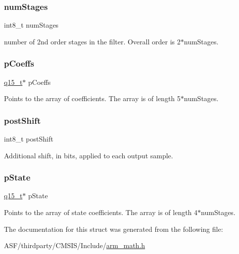 \subsubsection{\texorpdfstring{numStages}{numStages}}
{\footnotesize\ttfamily int8\+\_\+t num\+Stages}

number of 2nd order stages in the filter. Overall order is 2$\ast$num\+Stages. \mbox{\label{structarm__biquad__casd__df1__inst__q15_a7ca181a37f714d174445f486bebce26f}} 
\subsubsection{\texorpdfstring{pCoeffs}{pCoeffs}}
{\footnotesize\ttfamily \mbox{\hyperlink{arm__math_8h_ab5a8fb21a5b3b983d5f54f31614052ea}{q15\+\_\+t}}$\ast$ p\+Coeffs}

Points to the array of coefficients. The array is of length 5$\ast$num\+Stages. \mbox{\label{structarm__biquad__casd__df1__inst__q15_a3603cbf084938b6931bcb05dfe487f09}} 
\subsubsection{\texorpdfstring{postShift}{postShift}}
{\footnotesize\ttfamily int8\+\_\+t post\+Shift}

Additional shift, in bits, applied to each output sample. \mbox{\label{structarm__biquad__casd__df1__inst__q15_ae29dfdb736374fcddaeaec4b7770170c}} 
\subsubsection{\texorpdfstring{pState}{pState}}
{\footnotesize\ttfamily \mbox{\hyperlink{arm__math_8h_ab5a8fb21a5b3b983d5f54f31614052ea}{q15\+\_\+t}}$\ast$ p\+State}

Points to the array of state coefficients. The array is of length 4$\ast$num\+Stages. 

The documentation for this struct was generated from the following file\+:\begin{DoxyCompactItemize}
\item 
A\+S\+F/thirdparty/\+C\+M\+S\+I\+S/\+Include/\mbox{\hyperlink{arm__math_8h}{arm\+\_\+math.\+h}}\end{DoxyCompactItemize}
